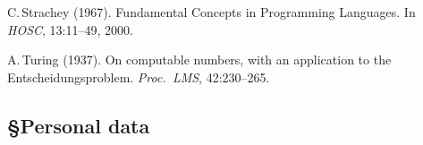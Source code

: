 \documentclass[11pt,twocolumn]{article}
\begin{document}
{\begin{thebibliography}{00}
C.\,Strachey (1967).
\newblock Fundamental Concepts in Programming Languages.  
\newblock In \emph{HOSC}, 13:11--49, 2000.

A.\,Turing (1937). 
\newblock On computable numbers, with an application to the
  Entscheidungsproblem. 
\newblock \emph{Proc.\ LMS}, 42:230--265.

\end{thebibliography}}

\clearpage
\setcounter{page}{1}

\subsection*{\S\enspace\thinspace Personal data}
\end{document}
